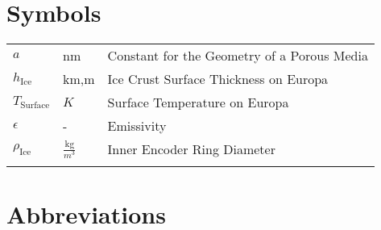 \chapter*{Symbols}


\renewcommand{\arraystretch}{1.2}

\begin{longtable}[l]{lll}
  $a$                      & nm                                          & Constant for the Geometry of a Porous Media   \\
$h_\text{Ice}$           & $\text{km}$,$\text{m}$                      & Ice Crust Surface Thickness on Europa         \\
$T_\text{Surface}$       & $K$                                         & Surface Temperature on Europa                 \\
$\epsilon$               & -                                           & Emissivity                                    \\
$\rho_\text{Ice}$       & $\frac{\text{kg}}{m^3}$                      & Inner Encoder Ring Diameter                   \\
   

\label{tab:my-table}\\
\end{longtable}




\chapter*{Abbreviations}


